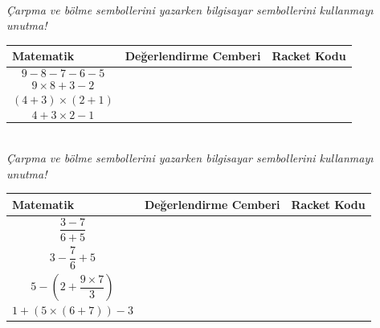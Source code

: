 \documentclass[12pt, a4paper]{article}
\begin{document}
\newpage
{}\\
\textit{Çarpma ve bölme sembollerini yazarken bilgisayar sembollerini kullanmayı unutma!}\\[2ex]
\begin{tabular}{| C{4cm} | C{6cm} | C{6cm} |  }
\hline
\bf Matematik&\bf Değerlendirme Cemberi&\bf Racket Kodu\\
\hline
\begin{displaymath} 9-8-7-6-5 \end{displaymath}  & &  \\[24ex]
\hline
\begin{displaymath} 9 \times 8 + 3 - 2 \end{displaymath} & &  \\[24ex]
\hline
\begin{displaymath} (4+3) \times (2+1) \end{displaymath}  & &  \\[24ex]
\hline
\begin{displaymath} 4+3 \times 2 - 1 \end{displaymath}   & &  \\[24ex]
\hline
\end{tabular}
\newpage
{}\\
\textit{Çarpma ve bölme sembollerini yazarken bilgisayar sembollerini kullanmayı unutma!}\\[2ex]
\begin{tabular}{| C{4cm} | C{6cm} | C{6cm} |  }
\hline
\bf Matematik&\bf Değerlendirme Cemberi&\bf Racket Kodu\\
\hline
\begin{displaymath} \frac {3 - 7 }{6 + 5} \end{displaymath}  & &  \\[24ex]
\hline
\begin{displaymath} 3 - \frac {7}{6} + 5 \end{displaymath} & &  \\[24ex]
\hline
\begin{displaymath} 5 - (2 + \frac{9 \times 7}{3}) \end{displaymath}  & &  \\[24ex]
\hline
\begin{displaymath} 1+(5 \times (6+7))-3 \end{displaymath}   & &  \\[24ex]
\hline
\end{tabular}
\end{document}
